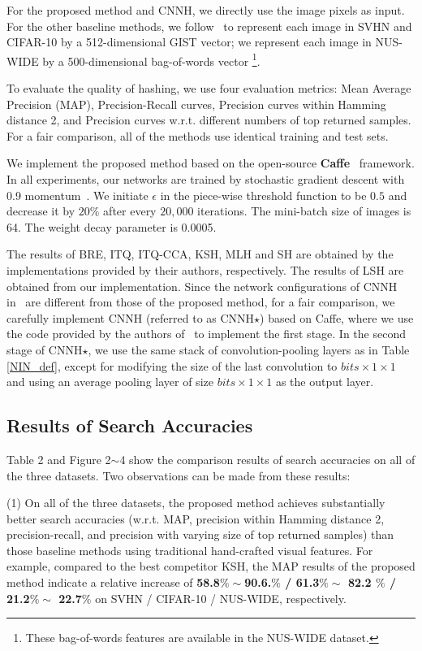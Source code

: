 \documentclass[10pt,twocolumn,letterpaper]{article}
\begin{document}
For the proposed method and CNNH, we directly use the image pixels as input. For the other baseline methods, we follow~\cite{CNNH,KSH} to represent each image in SVHN and CIFAR-10 by a 512-dimensional GIST vector; we represent each image in NUS-WIDE by a 500-dimensional bag-of-words vector \footnote{These bag-of-words features are available in the NUS-WIDE dataset.}.

To evaluate the quality of hashing, we use four evaluation metrics: Mean Average Precision ({MAP}), Precision-Recall curves, Precision curves within Hamming distance 2, and Precision curves w.r.t. different numbers of top returned samples. For a fair comparison, all of the methods use identical training and test sets.

We implement the proposed method based on the open-source \textbf{Caffe}~\cite{caffe} framework. In all experiments, our networks are trained by stochastic gradient descent with 0.9 momentum~\cite{momentum}.
We initiate $\epsilon$ in the piece-wise threshold function to be $0.5$ and decrease it by $20\%$ after every $20,000$ iterations. The mini-batch size of images is 64.
The weight decay parameter is 0.0005.

The results of BRE, ITQ, ITQ-CCA, KSH, MLH and SH are obtained by the implementations provided by their authors, respectively. The results of LSH are obtained from our implementation. Since the network configurations of CNNH in~\cite{CNNH} are different from those of the proposed method, for a fair comparison, we carefully implement CNNH (referred to as CNNH$\star$) based on Caffe, where we use the code provided by the authors of~\cite{CNNH} to implement the first stage. In the second stage of CNNH$\star$, we use the same stack of convolution-pooling layers as in Table \ref{NIN_def}, except for modifying the size of the last convolution to $bits\times 1\times 1$ and using an average pooling layer of size $bits\times 1\times 1$ as the output layer.


\subsection{Results of Search Accuracies}
Table 2 and Figure 2$\sim$4 show the comparison results of search accuracies on all of the three datasets. Two observations can be made from these results:

(1) On all of the three datasets, the proposed method achieves substantially better search accuracies (w.r.t. MAP, precision within Hamming distance 2, precision-recall, and precision with varying size of top returned samples) than those baseline methods using traditional hand-crafted visual features. For example, compared to the best competitor KSH, the MAP results of the proposed method indicate a relative increase of \textbf{58.8$\%\sim$90.6.$\%$ / 61.3$\%\sim$ 82.2 $\%$ / 21.2$\%\sim$ 22.7$\%$} on SVHN / CIFAR-10 / NUS-WIDE, respectively.
\end{document}

